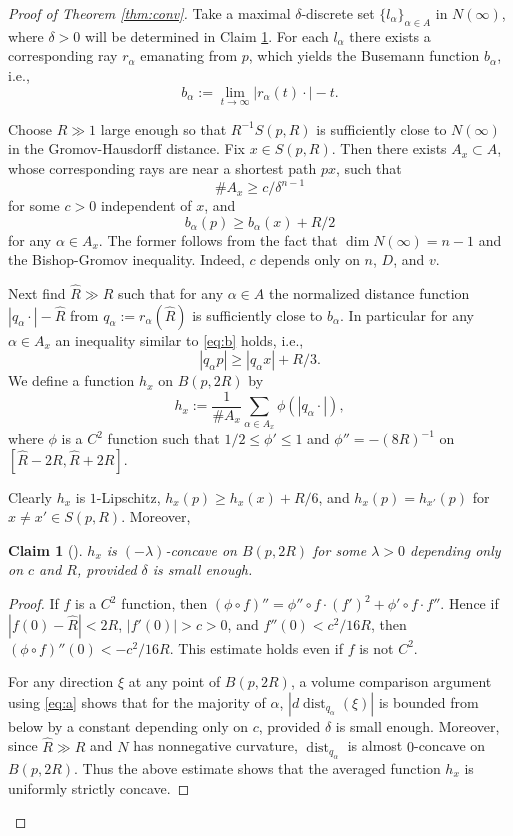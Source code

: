 \documentclass[a4paper,12pt]{amsart}
\theoremstyle{plain}
\newtheorem{clm}[thm]{Claim}
\theoremstyle{definition}
\numberwithin{thm}{section}
\numberwithin{equation}{section}
\DeclareMathOperator{\dist}{dist}
\begin{document}
\begin{proof}[Proof of Theorem \ref{thm:conv}]
Take a maximal $\delta$-discrete set $\{l_\alpha\}_{\alpha\in A}$ in $N(\infty)$, where $\delta>0$ will be determined in Claim \ref{clm:conc}.
For each $l_\alpha$ there exists a corresponding ray $r_\alpha$ emanating from $p$, which yields the Busemann function $b_\alpha$, i.e.,
\[b_\alpha:=\lim_{t\to\infty}|r_\alpha(t)\cdot|-t.\]

Choose $R\gg1$ large enough so that $R^{-1}S(p,R)$ is sufficiently close to $N(\infty)$ in the Gromov-Hausdorff distance.
Fix $x\in S(p,R)$.
Then there exists $A_x\subset A$, whose corresponding rays are near a shortest path $px$, such that
\begin{equation}\label{eq:a}
\# A_x\ge c/\delta^{n-1}
\end{equation}
for some $c>0$ independent of $x$, and
\begin{equation}\label{eq:b}
b_\alpha(p)\ge b_\alpha(x)+R/2
\end{equation}
for any $\alpha\in A_x$.
The former follows from the fact that $\dim N(\infty)=n-1$ and the Bishop-Gromov inequality.
Indeed, $c$ depends only on $n$, $D$, and $v$.

Next find $\hat R\gg R$ such that for any $\alpha\in A$ the normalized distance function $|q_\alpha\cdot|-\hat R$ from $q_\alpha:=r_\alpha(\hat R)$ is sufficiently close to $b_\alpha$.
In particular for any $\alpha\in A_x$ an inequality similar to \eqref{eq:b} holds, i.e.,
\[|q_\alpha p|\ge|q_\alpha x|+R/3.\]
We define a function $h_x$ on $B(p,2R)$ by
\[h_x:=\frac1{\# A_x}\sum_{\alpha\in A_x}\phi(|q_\alpha\cdot|),\]
where $\phi$ is a $C^2$ function such that $1/2\le\phi'\le 1$ and $\phi''=-(8R)^{-1}$ on $[\hat R-2R,\hat R+2R]$.

Clearly $h_x$ is $1$-Lipschitz, $h_x(p)\ge h_x(x)+R/6$, and $h_x(p)=h_{x'}(p)$ for $x\neq x'\in S(p,R)$.
Moreover,

\begin{clm}[{\cite[3.6]{Per:mor}}]\label{clm:conc}
$h_x$ is $(-\lambda)$-concave on $B(p,2R)$ for some $\lambda>0$ depending only on $c$ and $R$, provided $\delta$ is small enough.
\end{clm}

\begin{proof}
If $f$ is a $C^2$ function, then $(\phi\circ f)''=\phi''\circ f\cdot(f')^2+\phi'\circ f\cdot f''$.
Hence if $|f(0)-\hat R|<2R$, $|f'(0)|>c>0$, and $f''(0)<c^2/16R$, then $(\phi\circ f)''(0)<-c^2/16R$.
This estimate holds even if $f$ is not $C^2$.

For any direction $\xi$ at any point of $B(p,2R)$, a volume comparison argument using \eqref{eq:a} shows that  for the majority of $\alpha$, $|d\dist_{q_\alpha}(\xi)|$ is bounded from below by a constant depending only on $c$, provided $\delta$ is small enough.
Moreover, since $\hat R\gg R$ and $N$ has nonnegative curvature, $\dist_{q_\alpha}$ is almost $0$-concave on $B(p,2R)$.
Thus the above estimate shows that the averaged function $h_x$ is uniformly strictly concave.
\end{proof}


\end{proof}
\end{document}
